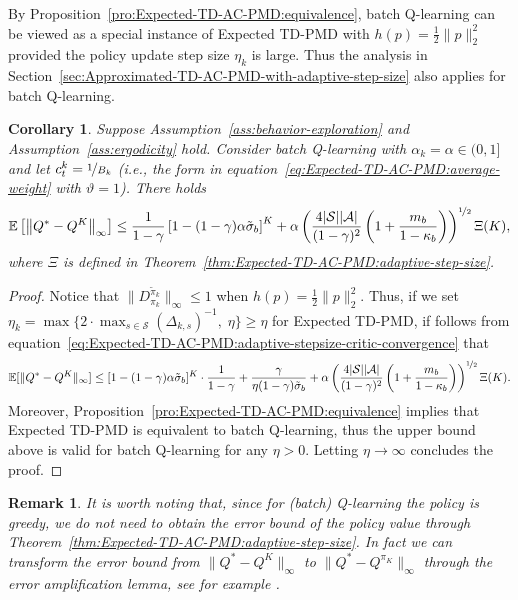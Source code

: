 \documentclass[10pt]{article}
\newcommand{\calA}{\mathcal{A}}
\newcommand{\calS}{\mathcal{S}}
\newcommand{\E}{\mathbb{E}}
\newcommand{\ls}{\left}
\newcommand{\rs}{\right}
\theoremstyle{plain}
\newtheorem{corollary}[theorem]{Corollary}
\newtheorem{remark}{Remark}[section]
\theoremstyle{definition}
\begin{document}
By Proposition~\ref{pro:Expected-TD-AC-PMD:equivalence}, batch Q-learning can be viewed as a special instance of Expected TD-PMD with $h(p)=\frac{1}{2}\| p \|_2^2$ provided the policy update step size $\eta_k$ is large. Thus the analysis in Section~\ref{sec:Approximated-TD-AC-PMD-with-adaptive-step-size} also applies for batch Q-learning.

\begin{corollary}
    Suppose Assumption~\ref{ass:behavior-exploration} and Assumption~\ref{ass:ergodicity} hold. Consider batch Q-learning  with $\alpha_k=\alpha\in(0,1]$ and let $c_t^k = \nicefrac{1}{B_k}$ \textup{(}i.e., the form in equation~\eqref{eq:Expected-TD-AC-PMD:average-weight} with $\vartheta=1$\textup{)}. There holds
    \begin{align*}
        \E\ls[ \ls\| Q^* - Q^K \rs\|_\infty \rs] \leq \frac{1}{1-\gamma} \ls[ 1 - (1-\gamma) \alpha\tilde\sigma_b \rs]^{K} + \alpha \ls( \frac{4|\calS||\calA|}{(1-\gamma)^2} \ls( 1 + \frac{m_b}{1-\kappa_b} \rs) \rs)^{\nicefrac{1}{2}} \Xi(K),
    \end{align*}
    where $\Xi$ is defined in Theorem~\ref{thm:Expected-TD-AC-PMD:adaptive-step-size}.
    \label{cor:batch-Q-learning}
\end{corollary}
\begin{proof}
Notice that $\| D^{\tilde\pi_k}_{\pi_k} \|_\infty\leq 1$ when $h(p)=\frac{1}{2}\|p\|_2^2$. Thus, if we set $\eta_k = \max\{ 2\cdot\max_{s\in\calS} (\varDelta_{k,s})^{-1}, \; \eta \}\geq \eta$ for Expected TD-PMD, if follows from equation~\eqref{eq:Expected-TD-AC-PMD:adaptive-stepsize-critic-convergence} that
    \begin{align*}
        \E[\| Q^* - Q^{K} \|_\infty] \leq [1-(1-\gamma)\alpha\tilde\sigma_b]^K \cdot \frac{1}{1-\gamma} + \frac{\gamma}{\eta(1-\gamma)\tilde\sigma_b} + \alpha \ls( \frac{4|\calS||\calA|}{(1-\gamma)^2} \ls( 1 + \frac{m_b}{1-\kappa_b} \rs) \rs)^{\nicefrac{1}{2}} \Xi(K).
    \end{align*}
    Moreover, Proposition~\ref{pro:Expected-TD-AC-PMD:equivalence} implies that Expected TD-PMD is equivalent to batch Q-learning, thus the upper bound above is valid for batch Q-learning for any $\eta > 0$. Letting $\eta \to \infty$ concludes the proof.
\end{proof}

\begin{remark}
    It is worth noting that, since for (batch) Q-learning the policy is greedy, we do not need to obtain the error bound of the policy value through Theorem~\ref{thm:Expected-TD-AC-PMD:adaptive-step-size}. In fact we can transform the error bound from $\| Q^* - Q^{K} \|_\infty$ to $\| Q^* - Q^{\pi_K} \|_\infty$ through the error amplification lemma, see for example \textup{\citet[Lemma 1.11]{Agarwal2019ReinforcementLT}}.
\end{remark}
\end{document}

